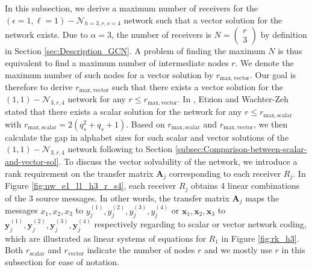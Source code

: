 In this subsection, we derive a maximum number of receivers for the
$\left(\epsilon=1,\ell=1\right)-\mathcal{N}_{h=3,r,s=4}$ network
such that a vector solution for the network exists. Due to $\alpha=3$,
the number of receivers is $N=\left(\begin{array}{c}
r\\
3
\end{array}\right)$ by definition in Section \ref{sec:Description_GCN}. A problem of
finding the maximum $N$ is thus equivalent to find a maximum number
of intermediate nodes $r$. We denote the maximum number of such nodes
for a vector solution by $r_{\mathrm{max,vector}}$. Our goal is therefore
to derive $r_{\mathrm{max,vector}}$ such that there exists a vector
solution for the $\left(1,1\right)-\mathcal{N}_{3,r,4}$ network for
any $r\leq r_{\mathrm{max,vector}}$. In \cite[Section VIII.C]{Wachter-Zeh:2018},
Etzion and Wachter-Zeh stated that there exists a scalar solution
for the network for any $r\leq r_{\mathrm{max,scalar}}$ with $r_{\mathrm{max,scalar}}=2\left(q_{s}^{2}+q_{s}+1\right)$.
Based on $r_{\mathrm{max,scalar}}$ and $r_{\mathrm{max,vector}}$,
we then calculate the gap in alphabet sizes for such scalar and vector
solutions of the $\left(1,1\right)-\mathcal{N}_{3,r,4}$ network following
to Section \ref{subsec:Comparison-between-scalar-and-vector-sol}.
To discuss the vector solvability of the network, we introduce a rank
requirement on the transfer matrix $\boldsymbol{A}_{j}$ corresponding
to each receiver $R_{j}$. In Figure \ref{fig:nw_e1_l1_h3_r_s4},
each receiver $R_{j}$ obtains 4 linear combinations of the 3 source
messages. In other words, the transfer matrix $\boldsymbol{A}_{j}$
maps the messages $x_{1},x_{2},x_{3}$ to $y_{j}^{\left(1\right)},y_{j}^{\left(2\right)},y_{j}^{\left(3\right)},y_{j}^{\left(4\right)}$
or $\boldsymbol{x}_{1},\boldsymbol{x}_{2},\boldsymbol{x}_{3}$ to
$\boldsymbol{y}_{j}^{\left(1\right)},\boldsymbol{y}_{j}^{\left(2\right)},\boldsymbol{y}_{j}^{\left(3\right)},\boldsymbol{y}_{j}^{\left(4\right)}$
respectively regarding to scalar or vector network coding, which are
illustrated as linear systems of equations for $R_{1}$ in Figure
\ref{fig:rk_h3}. Both $r_{\mathrm{scalar}}$ and $r_{\mathrm{vector}}$
indicate the number of nodes $r$ and we mostly use $r$ in this subsection
for ease of notation.

